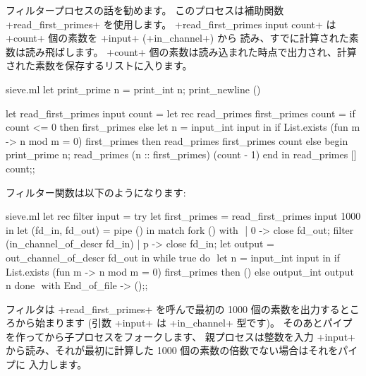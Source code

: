 フィルタープロセスの話を勧めます。
このプロセスは補助関数 \ml+read_first_primes+ を使用します。
\ml+read_first_primes input count+ は \ml+count+ 個の素数を \ml+input+ (\ml+in_channel+) から
読み、すでに計算された素数は読み飛ばします。
\ml+count+ 個の素数は読み込まれた時点で出力され、計算された素数を保存するリストに入ります。
%
\begin{listingcodefile}[style=numbers]{sieve.ml}
let print_prime n = print_int n; print_newline ()

let read_first_primes input count =
  let rec read_primes first_primes count =
    if count <= 0 then first_primes else
    let n = input_int input in
    if List.exists (fun m -> n mod m = 0) first_primes then
      read_primes first_primes count
    else begin
      print_prime n;
      read_primes (n :: first_primes) (count - 1)
    end
  in
  read_primes [] count$\label{prog:pprime}$;;
\end{listingcodefile}
%
フィルター関数は以下のようになります:
%
\begin{listingcodefile}[style=numbers]{sieve.ml}
let rec filter input =
  try
    let first_primes = read_first_primes input 1000 in
    let (fd_in, fd_out) = pipe () in
    match fork () with $\label{prog:sievefilterfork}$
    | 0 ->
        close fd_out;
        filter (in_channel_of_descr fd_in)
    | p ->
        close fd_in;
        let output = out_channel_of_descr fd_out in
        while true do $\label{prog:sievefilterwhile}$
          let n = input_int input in
          if List.exists (fun m -> n mod m = 0) first_primes then ()
          else output_int output n
        done $\label{prog:sievefilterdone}$
  with End_of_file -> ();;
\end{listingcodefile}
%
フィルタは \ml+read_first_primes+ を呼んで最初の 1000 個の素数を出力するところから始まります
(引数 \ml+input+ は \ml+in_channel+ 型です)。
そのあとパイプを作ってから子プロセスをフォークします、
親プロセスは整数を入力 \ml+input+ から読み、それが最初に計算した 1000 個の素数の倍数でない場合はそれをパイプに
入力します。

